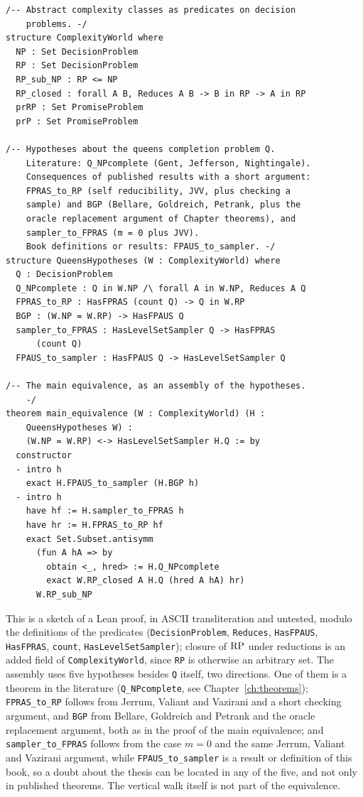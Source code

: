 \begin{footnotesize}
\begin{verbatim}
/-- Abstract complexity classes as predicates on decision
    problems. -/
structure ComplexityWorld where
  NP : Set DecisionProblem
  RP : Set DecisionProblem
  RP_sub_NP : RP <= NP
  RP_closed : forall A B, Reduces A B -> B in RP -> A in RP
  prRP : Set PromiseProblem
  prP : Set PromiseProblem

/-- Hypotheses about the queens completion problem Q.
    Literature: Q_NPcomplete (Gent, Jefferson, Nightingale).
    Consequences of published results with a short argument:
    FPRAS_to_RP (self reducibility, JVV, plus checking a
    sample) and BGP (Bellare, Goldreich, Petrank, plus the
    oracle replacement argument of Chapter theorems), and
    sampler_to_FPRAS (m = 0 plus JVV).
    Book definitions or results: FPAUS_to_sampler. -/
structure QueensHypotheses (W : ComplexityWorld) where
  Q : DecisionProblem
  Q_NPcomplete : Q in W.NP /\ forall A in W.NP, Reduces A Q
  FPRAS_to_RP : HasFPRAS (count Q) -> Q in W.RP
  BGP : (W.NP = W.RP) -> HasFPAUS Q
  sampler_to_FPRAS : HasLevelSetSampler Q -> HasFPRAS
      (count Q)
  FPAUS_to_sampler : HasFPAUS Q -> HasLevelSetSampler Q

/-- The main equivalence, as an assembly of the hypotheses.
    -/
theorem main_equivalence (W : ComplexityWorld) (H :
    QueensHypotheses W) :
    (W.NP = W.RP) <-> HasLevelSetSampler H.Q := by
  constructor
  - intro h
    exact H.FPAUS_to_sampler (H.BGP h)
  - intro h
    have hf := H.sampler_to_FPRAS h
    have hr := H.FPRAS_to_RP hf
    exact Set.Subset.antisymm
      (fun A hA => by
        obtain <_, hred> := H.Q_NPcomplete
        exact W.RP_closed A H.Q (hred A hA) hr)
      W.RP_sub_NP
\end{verbatim}
\end{footnotesize}

This is a sketch of a Lean proof, in ASCII transliteration and untested, modulo the definitions of the predicates (\texttt{DecisionProblem}, \texttt{Reduces}, \texttt{HasFPAUS}, \texttt{HasFPRAS}, \texttt{count}, \texttt{HasLevelSetSampler}); closure of $\mathrm{RP}$ under reductions is an added field of \texttt{ComplexityWorld}, since \texttt{RP} is otherwise an arbitrary set. The assembly uses five hypotheses besides \texttt{Q} itself, two directions. One of them is a theorem in the literature (\texttt{Q\_NPcomplete}, see Chapter~\ref{ch:theorems}); \texttt{FPRAS\_to\_RP} follows from Jerrum, Valiant and Vazirani and a short checking argument, and \texttt{BGP} from Bellare, Goldreich and Petrank and the oracle replacement argument, both as in the proof of the main equivalence; and \texttt{sampler\_to\_FPRAS} follows from the case $m = 0$ and the same Jerrum, Valiant and Vazirani argument, while \texttt{FPAUS\_to\_sampler} is a result or definition of this book, so a doubt about the thesis can be located in any of the five, and not only in published theorems. The vertical walk itself is not part of the equivalence.

